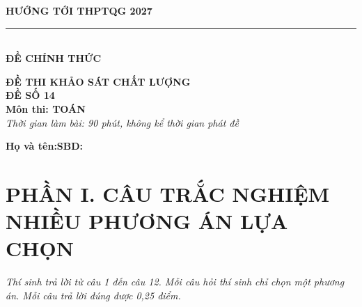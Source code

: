 \documentclass[12pt,a4paper]{article}
\begin{document}
\noindent
\begin{minipage}[t]{0.40\textwidth}
    \centering
    \textbf{HƯỚNG TỚI THPTQG 2027}\\[-2pt]
    \rule{3.2cm}{0.6pt}\\[4pt]
    \textbf{ĐỀ CHÍNH THỨC}
\end{minipage}\hfill
\begin{minipage}[t]{0.58\textwidth}
    \centering
    \textbf{ĐỀ THI KHẢO SÁT CHẤT LƯỢNG}\\
    \textbf{ĐỀ SỐ 14}\\
    \textbf{Môn thi: TOÁN}\\
    \textit{\small Thời gian làm bài: 90 phút, không kể thời gian phát đề}
\end{minipage}

\vspace{0.2cm}
\noindent
\begin{minipage}[b]{0.78\textwidth}
    \textbf{Họ và tên:}\dotfill\textbf{SBD:}\makebox[3.5cm]{\dotfill}
\end{minipage}\hfill
\begin{minipage}[b]{0.20\textwidth}
    \hfill
    \setlength{\fboxrule}{0.8pt}%
\end{minipage}
\vspace{0.2cm}

\section*{\large PHẦN I. CÂU TRẮC NGHIỆM NHIỀU PHƯƠNG ÁN LỰA CHỌN}
\textit{Thí sinh trả lời từ câu 1 đến câu 12. Mỗi câu hỏi thí sinh chỉ chọn một phương án. Mỗi câu trả lời đúng được 0,25 điểm.}
\end{document}
